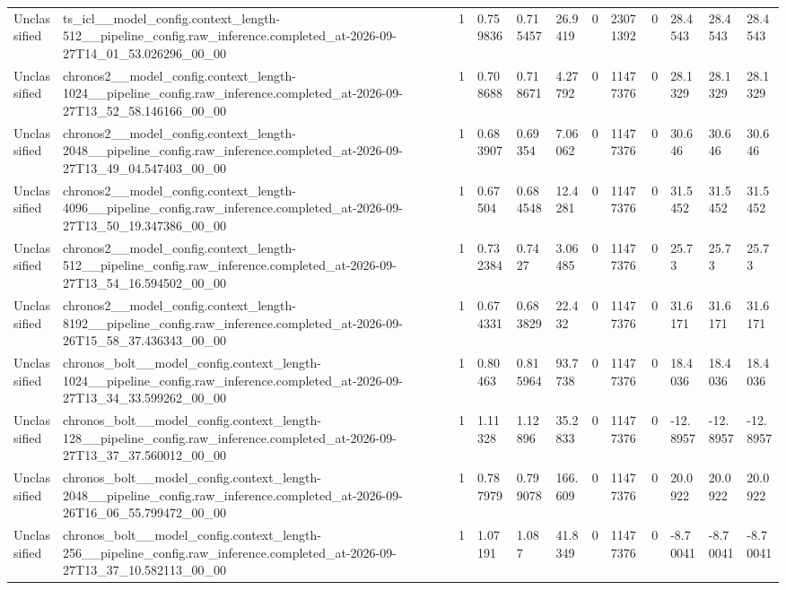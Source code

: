 \begin{tabular}{llllllllllll}
Unclassified & ts\_icl\_\_model\_config.context\_length-512\_\_pipeline\_config.raw\_inference.completed\_at-2026-09-27T14\_01\_53.026296\_00\_00 & 1 & 0.759836 & 0.715457 & 26.9419 & 0 & 23071392 & 0 & 28.4543 & 28.4543 & 28.4543 \\
Unclassified & chronos2\_\_model\_config.context\_length-1024\_\_pipeline\_config.raw\_inference.completed\_at-2026-09-27T13\_52\_58.146166\_00\_00 & 1 & 0.708688 & 0.718671 & 4.27792 & 0 & 11477376 & 0 & 28.1329 & 28.1329 & 28.1329 \\
Unclassified & chronos2\_\_model\_config.context\_length-2048\_\_pipeline\_config.raw\_inference.completed\_at-2026-09-27T13\_49\_04.547403\_00\_00 & 1 & 0.683907 & 0.69354 & 7.06062 & 0 & 11477376 & 0 & 30.646 & 30.646 & 30.646 \\
Unclassified & chronos2\_\_model\_config.context\_length-4096\_\_pipeline\_config.raw\_inference.completed\_at-2026-09-27T13\_50\_19.347386\_00\_00 & 1 & 0.67504 & 0.684548 & 12.4281 & 0 & 11477376 & 0 & 31.5452 & 31.5452 & 31.5452 \\
Unclassified & chronos2\_\_model\_config.context\_length-512\_\_pipeline\_config.raw\_inference.completed\_at-2026-09-27T13\_54\_16.594502\_00\_00 & 1 & 0.732384 & 0.7427 & 3.06485 & 0 & 11477376 & 0 & 25.73 & 25.73 & 25.73 \\
Unclassified & chronos2\_\_model\_config.context\_length-8192\_\_pipeline\_config.raw\_inference.completed\_at-2026-09-26T15\_58\_37.436343\_00\_00 & 1 & 0.674331 & 0.683829 & 22.432 & 0 & 11477376 & 0 & 31.6171 & 31.6171 & 31.6171 \\
Unclassified & chronos\_bolt\_\_model\_config.context\_length-1024\_\_pipeline\_config.raw\_inference.completed\_at-2026-09-27T13\_34\_33.599262\_00\_00 & 1 & 0.80463 & 0.815964 & 93.7738 & 0 & 11477376 & 0 & 18.4036 & 18.4036 & 18.4036 \\
Unclassified & chronos\_bolt\_\_model\_config.context\_length-128\_\_pipeline\_config.raw\_inference.completed\_at-2026-09-27T13\_37\_37.560012\_00\_00 & 1 & 1.11328 & 1.12896 & 35.2833 & 0 & 11477376 & 0 & -12.8957 & -12.8957 & -12.8957 \\
Unclassified & chronos\_bolt\_\_model\_config.context\_length-2048\_\_pipeline\_config.raw\_inference.completed\_at-2026-09-26T16\_06\_55.799472\_00\_00 & 1 & 0.787979 & 0.799078 & 166.609 & 0 & 11477376 & 0 & 20.0922 & 20.0922 & 20.0922 \\
Unclassified & chronos\_bolt\_\_model\_config.context\_length-256\_\_pipeline\_config.raw\_inference.completed\_at-2026-09-27T13\_37\_10.582113\_00\_00 & 1 & 1.07191 & 1.087 & 41.8349 & 0 & 11477376 & 0 & -8.70041 & -8.70041 & -8.70041 \\

\end{tabular}
